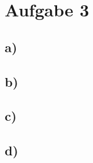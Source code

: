 \pagebreak
\section*{Aufgabe 3}
\subsection*{a)}
\subsection*{b)}
\subsection*{c)}
\subsection*{d)}


